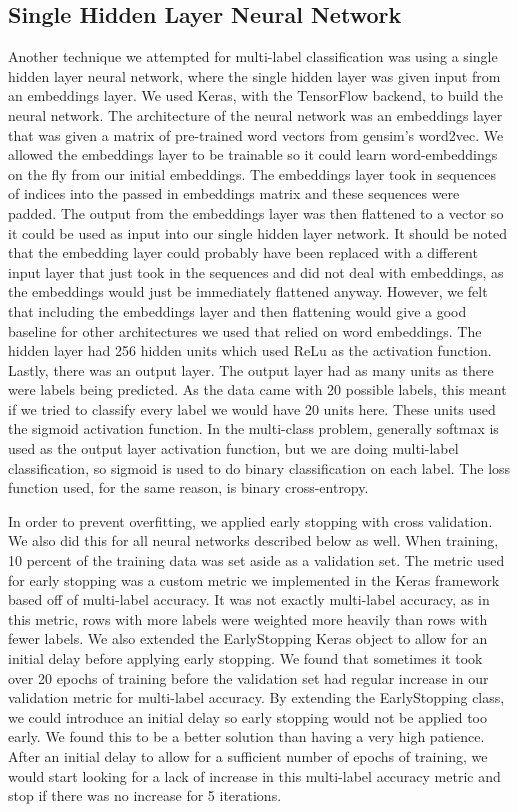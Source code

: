 \documentclass[sigconf]{acmart}
\begin{document}
\subsection{Single Hidden Layer Neural Network}
Another technique we attempted for multi-label classification was using a single hidden layer neural network, where the single hidden layer was given input from an embeddings layer. We used Keras, with the TensorFlow backend, to build the neural network.  The architecture of the neural network was an embeddings layer that was given a matrix of pre-trained word vectors from gensim's word2vec.  We allowed the embeddings layer to be trainable so it could learn word-embeddings on the fly from our initial embeddings. The embeddings layer took in sequences of indices into the passed in embeddings matrix and these sequences were padded. The output from the embeddings layer was then flattened to a vector so it could be used as input into our single hidden layer network. It should be noted that the embedding layer could probably have been replaced with a different input layer that just took in the sequences and did not deal with embeddings, as the embeddings would just be immediately flattened anyway.  However, we felt that including the embeddings layer and then flattening would give a good baseline for other architectures we used that relied on word embeddings.  The hidden layer had 256 hidden units which used ReLu as the activation function.  Lastly, there was an output layer.  The output layer had as many units as there were labels being predicted. As the data came with 20 possible labels, this meant if we tried to classify every label we would have 20 units here.  These units used the sigmoid activation function. In the multi-class problem, generally softmax is used as the output layer activation function, but we are doing multi-label classification, so sigmoid is used to do binary classification on each label.  The loss function used, for the same reason, is binary cross-entropy. 

In order to prevent overfitting, we applied early stopping with cross validation. We also did this for all neural networks described below as well.  When training, 10 percent of the training data was set aside as a validation set.  The metric used for early stopping was a custom metric we implemented in the Keras framework based off of multi-label accuracy. It was not exactly multi-label accuracy, as in this metric, rows with more labels were weighted more heavily than rows with fewer labels. We also extended the EarlyStopping Keras object to allow for an initial delay before applying early stopping. We found that sometimes it took over 20 epochs of training before the validation set had regular increase in our validation metric for multi-label accuracy. By extending the EarlyStopping class, we could introduce an initial delay so early stopping would not be applied too early. We found this to be a better solution than having a very high patience. After an initial delay to allow for a sufficient number of epochs of training, we would start looking for a lack of increase in this multi-label accuracy metric and stop if there was no increase for 5 iterations. 
\end{document}
